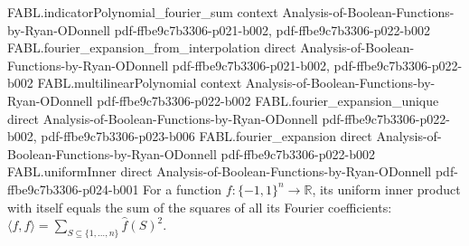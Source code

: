 \begin{theorem}
\proofstep
  {FABL.indicatorPolynomial_fourier_sum}
  {context}
  {Analysis-of-Boolean-Functions-by-Ryan-ODonnell}
  {pdf-ffbe9c7b3306-p021-b002,
    pdf-ffbe9c7b3306-p022-b002}
\proofstep
  {FABL.fourier_expansion_from_interpolation}
  {direct}
  {Analysis-of-Boolean-Functions-by-Ryan-ODonnell}
  {pdf-ffbe9c7b3306-p021-b002,
    pdf-ffbe9c7b3306-p022-b002}
\proofstep
  {FABL.multilinearPolynomial}
  {context}
  {Analysis-of-Boolean-Functions-by-Ryan-ODonnell}
  {pdf-ffbe9c7b3306-p022-b002}
\proofstep
  {FABL.fourier_expansion_unique}
  {direct}
  {Analysis-of-Boolean-Functions-by-Ryan-ODonnell}
  {pdf-ffbe9c7b3306-p022-b002,
    pdf-ffbe9c7b3306-p023-b006}
\proofstep
  {FABL.fourier_expansion}
  {direct}
  {Analysis-of-Boolean-Functions-by-Ryan-ODonnell}
  {pdf-ffbe9c7b3306-p022-b002}
\proofstep
  {FABL.uniformInner}
  {direct}
  {Analysis-of-Boolean-Functions-by-Ryan-ODonnell}
  {pdf-ffbe9c7b3306-p024-b001}
For a function $f:\{-1,1\}^n\to\mathbb{R}$, its uniform inner product with itself equals
the sum of the squares of all its Fourier coefficients: $\langle
f,f\rangle=\sum_{S\subseteq\{1,\ldots,n\}}\widehat f(S)^2$.
\end{theorem}

